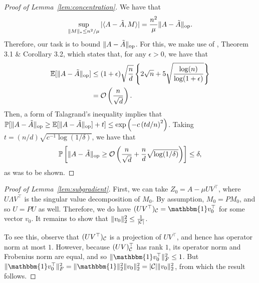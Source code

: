 \documentclass[11pt]{article}
\newcommand{\A}{\tilde{A}}
\newcommand{\oo}{\mathcal{O}}
\newcommand{\bi}{\mathbbm{1}}
\begin{document}
\begin{proof}[Proof of Lemma~\ref{lem:concentration}]
We have that 
\[ \sup_{\|M\|_* \leq n^2/\mu} |\langle A-\A, M \rangle| = \frac{n^2}{\mu}\|A-\A\|_{\op}. \]
Therefore, our task is to bound $\|A-\A\|_{\op}$. For this, we make use of \citet{bandeira2014sharp}, 
Theorem 3.1 \& Corollary 3.2, which states that, for any $\epsilon > 0$, we have that
\begin{align}
\bE[\|A-\A\|_{\op}] &\leq (1+\epsilon)\sqrt{\frac{n}{d}}\left\{2\sqrt{n} + 5\sqrt{\frac{\log(n)}{\log(1+\epsilon)}}\right\} \\
 &= \oo\p{\frac{n}{\sqrt{d}}}.
\end{align}
Then, a form of Talagrand's inequality implies that
$\bP[\|A-\A\|_{\op} \geq \bE[\|A-\A\|_{\op}] + t] \leq \exp\p{-c\p{td/n}^2}$. 
Taking $t = (n/d)\sqrt{c^{-1}\log(1/\delta)}$, we have that 
\[ \bP\left[\|A-\A\|_{\op} \geq \oo\p{\frac{n}{\sqrt{d}} + \frac{n}{d}\sqrt{\log(1/\delta)}}\right] \leq \delta, \]
as was to be shown.
\end{proof}

\begin{proof}[Proof of Lemma~\ref{lem:subgradient}]
First, we can take $Z_0 = A - \mu UV^{\top}$, where $U \Lambda V^{\top}$ is the singular 
value decomposition of $M_0$. By assumption, $M_0 = PM_0$, and so $U = PU$ as well. Therefore, 
we do have $(UV^{\top})_{\sC} = \bi v_0^{\top}$ for some vector $v_0$. It remains to show that 
$\|v_0\|_2^2 \leq \frac{1}{|\mathcal{C}|}$.

To see this, observe that $(UV^{\top})_{\mathcal{C}}$ is a projection of $UV^{\top}$, and hence 
has operator norm at most $1$. However, because $(UV)^{\top}_{\mathcal{C}}$ has rank $1$, its 
operator norm and Frobenius norm are equal, and so $\|\bi v_0^{\top}\|_F^2 \leq 1$. 
But $\|\bi v_0^{\top}\|_F^2 = \|\bi\|_2^2\|v_0\|_2^2 = |\sC|\|v_0\|_2^2$, from which 
the result follows.
\end{proof}



\end{document}
